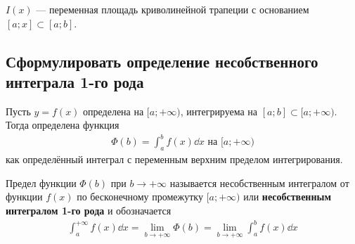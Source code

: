\begin{figure}[h]
    \centering
\end{figure}
$I(x)$ --- переменная площадь криволинейной трапеции с основанием $[a;x] \subset [a;b]$.

\subsection{Сформулировать определение несобственного интеграла 1-го рода}
Пусть $y = f(x)$ определена на $[a; +\infty)$, интегрируема на $[a;b]\subset [a; +\infty)$. Тогда определена функция
\begin{gather}
    \boxed{\Phi (b) = \int_{a}^{b} f(x)\dd{x}} \text{ на } [a; +\infty)
\end{gather}
как определённый интеграл с переменным верхним пределом интегрирования.\\
\begin{definition}
    Предел функции $\Phi(b)$ при $b\to +\infty$ называется несобственным интегралом от функции $f(x)$ по бесконечному промежутку $[a; +\infty)$ или \textbf{несобственным интегралом 1-го рода} и обозначается
    \begin{gather}
        \boxed{\int_{a}^{+\infty} f(x)\dd{x} = \lim_{b \to +\infty} \Phi(b) = \lim\limits_{b \to +\infty} \int_{a}^{b}f(x)\dd{x}} 
    \end{gather}
\end{definition}

\newpage
